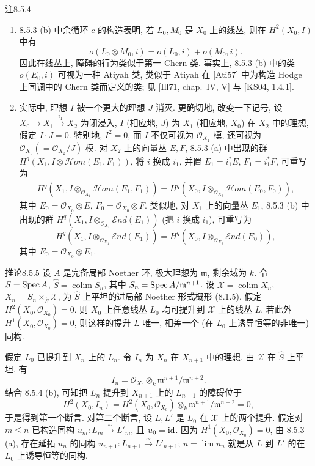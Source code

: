 \begin{origstatement}{注}{8.5.4}\label{ch08:rem854}
\begin{enumerate}
\item[(a)] 8.5.3 (b) 中余循环 $c$ 的构造表明, 若 $L_0,M_0$ 是 $X_0$ 上的线丛, 则在 $H^2(X_0,I)$ 中有
\[o(L_0\otimes M_0,i)=o(L_0,i)+o(M_0,i).\]
因此在线丛上, 障碍的行为类似于第一 Chern 类. 事实上, 8.5.3 (b) 中的类 $o(E_0,i)$ 可视为一种 Atiyah 类, 类似于 Atiyah 在 [Ati57] 中为构造 Hodge 上同调中的 Chern 类而定义的类; 见 [Ill71, chap.~IV, V] 与 [KS04, 1.4.1].
\item[(b)] 实际中, 理想 $I$ 被一个更大的理想 $J$ 消灭. 更确切地, 改变一下记号, 设 $X_0\longrightarrow X_1\xrightarrow{i_1}X_2$ 为闭浸入, $I$ (相应地, $J$) 为 $X_1$ (相应地, $X_0$) 在 $X_2$ 中的理想, 假定 $I\cdot J=0$. 特别地, $I^2=0$, 而 $I$ 不仅可视为 $\mathcal O_{X_1}$ 模, 还可视为 $\mathcal O_{X_0}(=\mathcal O_{X_2}/J)$ 模. 对 $X_2$ 上的向量丛 $E,F$, 8.5.3 (a) 中出现的群 $H^q(X_1,I\otimes\mathcal Hom(E_1,F_1))$, 将 $i$ 换成 $i_1$, 并置 $E_1=i_1^*E$, $F_1=i_1^*F$, 可重写为
\[\begin{aligned}
H^q(X_1,I\otimes_{\mathcal O_{X_1}}\mathcal Hom(E_1,F_1))
=H^q(X_0,I\otimes_{\mathcal O_{X_0}}\mathcal Hom(E_0,F_0)),
\end{aligned}\]
其中 $E_0=\mathcal O_{X_0}\otimes E$, $F_0=\mathcal O_{X_0}\otimes F$. 类似地, 对 $X_1$ 上的向量丛 $E_1$, 8.5.3 (b) 中出现的群 $H^q(X_1,I\otimes_{\mathcal O_{X_1}}\mathcal End(E_1))$ (把 $i$ 换成 $i_1$), 可重写为
\[H^q(X_1,I\otimes_{\mathcal O_{X_1}}\mathcal End(E_1))=H^q(X_0,I\otimes_{\mathcal O_{X_0}}\mathcal End(E_0)),\]
其中 $E_0=\mathcal O_{X_0}\otimes E_1$.
\end{enumerate}
\end{origstatement}

\begin{origstatement}{推论}{8.5.5}\label{ch08:cor855}
设 $A$ 是完备局部 Noether 环, 极大理想为 $\mathfrak m$, 剩余域为 $k$. 令 $S=\operatorname{Spec} A$, $\widehat S=\operatorname{colim}S_n$, 其中 $S_n=\operatorname{Spec} A/\mathfrak m^{n+1}$. 设 $\mathcal X=\operatorname{colim}X_n$, $X_n=S_n\times_{\widehat S}\mathcal X$, 为 $\widehat S$ 上平坦的进局部 Noether 形式概形 (8.1.5), 假定 $H^2(X_0,\mathcal O_{X_0})=0$. 则 $X_0$ 上任意线丛 $L_0$ 均可提升到 $\mathcal X$ 上的线丛 $L$. 若此外 $H^1(X_0,\mathcal O_{X_0})=0$, 则这样的提升 $L$ 唯一, 相差一个 (在 $L_0$ 上诱导恒等的非唯一) 同构.
\end{origstatement}
假定 $L_0$ 已提升到 $X_n$ 上的 $L_n$. 令 $I_n$ 为 $X_n$ 在 $X_{n+1}$ 中的理想. 由 $\mathcal X$ 在 $\widehat S$ 上平坦, 有
\[I_n=\mathcal O_{X_0}\otimes_k\mathfrak m^{n+1}/\mathfrak m^{n+2}.\]
结合 8.5.4 (b), 可知把 $L_n$ 提升到 $X_{n+1}$ 上的 $L_{n+1}$ 的障碍位于
\[H^2(X_0,I_n)=H^2(X_0,\mathcal O_{X_0})\otimes_k\mathfrak m^{n+1}/\mathfrak m^{n+2}=0,\]
于是得到第一个断言. 对第二个断言, 设 $L,L'$ 是 $L_0$ 在 $\mathcal X$ 上的两个提升. 假定对 $m\leq n$ 已构造同构 $u_m:L_m\xrightarrow\sim L'_m$, 且 $u_0=\mathrm{id}$. 因为 $H^1(X_0,\mathcal O_{X_0})=0$, 由 8.5.3 (a), 存在延拓 $u_n$ 的同构 $u_{n+1}:L_{n+1}\xrightarrow\sim L'_{n+1}$; $u=\lim u_n$ 就是从 $L$ 到 $L'$ 的在 $L_0$ 上诱导恒等的同构.

